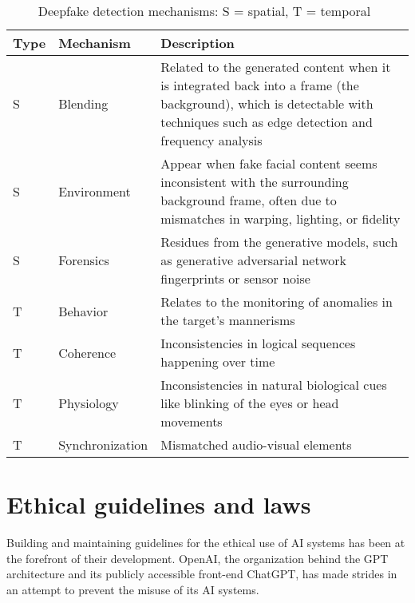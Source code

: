 \begin{table}[h!]  

\renewcommand{\arraystretch}{1.5} %
\setlength{\tabcolsep}{5pt} %
\begin{tabularx}{\textwidth}{|l|l|X|} %
\hline  
\textbf{Type} & \textbf{Mechanism} & \textbf{Description} \\ \hline  
S & Blending & Related to the generated content when it is integrated back into a frame (the background), which is detectable with techniques such as edge detection and frequency analysis \\ \hline  
S & Environment & Appear when fake facial content seems inconsistent
with the surrounding background frame, often due to mismatches in warping, lighting, or
fidelity \\ \hline  
S & Forensics & Residues from the generative models, such as generative
adversarial network fingerprints or sensor noise \\ \hline  
T & Behavior & Relates to the monitoring of anomalies in the target’s mannerisms \\ \hline  
T & Coherence & Inconsistencies in logical sequences
happening over time\\ \hline  
T & Physiology & Inconsistencies in natural biological cues like blinking of
the eyes or head movements \\ \hline  
T & Synchronization & Mismatched
audio-visual elements \\ \hline  
\end{tabularx}  
\caption{Deepfake detection mechanisms: S = spatial, T = temporal~\citep{mirsky_Creation_Detection_Deepfakes_2021}}  
\label{table:deepfake_artifacts}  
\end{table}  





\section{Ethical guidelines and laws}

\begin{comment}
\end{comment}

Building and maintaining guidelines for the ethical use of AI systems has been at the forefront of their development. OpenAI, the organization behind the GPT architecture and its publicly accessible front-end ChatGPT, has made strides in an attempt to prevent the misuse of its AI systems.

